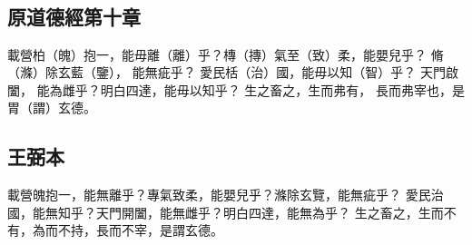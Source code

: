 ﻿%
%

\chapter{~}

\section{原道德經第十章}

\begin{withgezhu}

\zhsong


\colorbox{adding-color}{載營柏（\textcolor{tongjia-color}{魄}）抱一，能毋離（\textcolor{tongjia-color}{離}）乎？槫（\textcolor{tongjia-color}{摶}）氣至（\textcolor{tongjia-color}{致}）柔，}能嬰兒乎？
脩（\textcolor{tongjia-color}{滌}）除玄藍（\textcolor{tongjia-color}{鑒}），
能無疵乎？
\colorbox{adding-color}{愛民栝（\textcolor{tongjia-color}{治}）國，能毋以知（\textcolor{tongjia-color}{智}）乎？}
\colorbox{adding-color}{天門啟闔}，
\colorbox{adding-color}{能為雌乎？明白四達，能毋以知乎？}
生之畜之，生而弗\colorbox{adding-color}{有}，
\colorbox{adding-color}{長而弗宰也，是胃（\textcolor{tongjia-color}{謂}）玄}德。

\end{withgezhu}

\section{王弼本}

\begin{withgezhu}

\zhsong

載營魄抱一，能無離乎？專氣致柔，能嬰兒乎？滌除玄覽，能無疵乎？
愛民治國，能無知乎？天門開闔，能無雌乎？明白四達，能無為乎？
生之畜之，生而不有，為而不持，長而不宰，是謂玄德。

\end{withgezhu}

